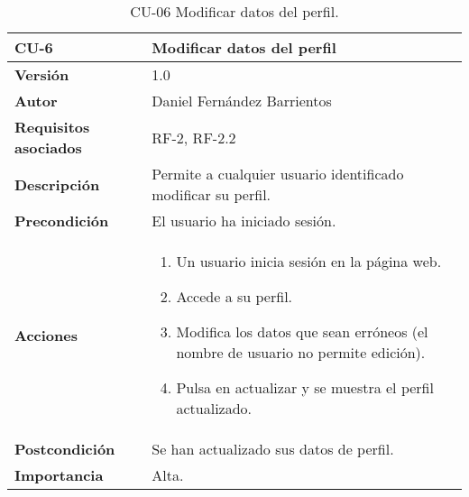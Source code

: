 \begin{table}[p]
	\centering
	\begin{tabularx}{\linewidth}{ p{} p{} }
		\toprule
		\textbf{CU-6}    & \textbf{Modificar datos del perfil}\\
		\toprule
		\textbf{Versión}              & 1.0    \\
		\textbf{Autor}                & Daniel Fernández Barrientos \\
		\textbf{Requisitos asociados} & RF-2, RF-2.2 \\
		\textbf{Descripción}          & Permite a cualquier usuario identificado modificar su perfil. \\
		\textbf{Precondición}         & El usuario ha iniciado sesión. \\
		\textbf{Acciones}             &
		\begin{enumerate}
			\def\labelenumi{\arabic{enumi}.}
			\tightlist
			\item Un usuario inicia sesión en la página web.
			\item Accede a su perfil.
			\item Modifica los datos que sean erróneos (el nombre de usuario no permite edición).
			\item Pulsa en actualizar y se muestra el perfil actualizado.
		\end{enumerate}\\
		\textbf{Postcondición}        & Se han actualizado sus datos de perfil. \\
		\textbf{Importancia}          & Alta. \\
		\bottomrule
	\end{tabularx}
	\caption{CU-06 Modificar datos del perfil.}
\end{table}

